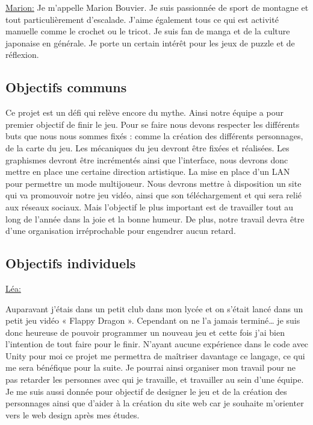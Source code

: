 \documentclass[12pt]{extarticle}
\begin{document}
\newpage
\underline{Marion:}
Je m'appelle Marion Bouvier. Je suis passionnée de sport de montagne et tout particulièrement d'escalade. J'aime également tous ce qui est activité manuelle comme le crochet ou le tricot. Je suis fan de manga et de la culture japonaise en générale. Je porte un certain intérêt pour les jeux de puzzle et de réflexion.

\subsection{Objectifs communs}

Ce projet est un défi qui relève encore du mythe. Ainsi notre équipe a pour premier objectif de finir le jeu. Pour se faire nous devons respecter les différents buts que nous nous sommes fixés :
comme la création des différents personnages, de la carte du jeu. Les mécaniques du jeu devront être fixées et réalisées. Les graphismes devront être incrémentés ainsi que l’interface, nous devrons donc mettre en place une certaine direction artistique. La mise en place d’un LAN pour permettre un mode multijoueur. Nous devrons mettre à disposition un site qui va promouvoir notre jeu vidéo, ainsi que son téléchargement et qui sera relié aux réseaux sociaux. Mais l’objectif le plus important est de travailler tout au long de l’année dans la joie et la bonne humeur. De plus, notre travail devra être d’une organisation irréprochable pour engendrer aucun retard.

\newpage

\subsection{Objectifs individuels}

\vspace{0.5cm}
\underline{Léa:}

Auparavant j’étais dans un petit club dans mon lycée et on s’était lancé dans un petit jeu vidéo « Flappy Dragon ». Cependant on ne l’a jamais terminé… je suis donc heureuse de pouvoir programmer un nouveau jeu et cette fois j’ai bien l’intention de tout faire pour le finir. N’ayant aucune expérience dans le code avec Unity pour moi ce projet me permettra de maîtriser davantage ce langage, ce qui me sera bénéfique pour la suite. Je pourrai ainsi organiser mon travail pour ne pas retarder les personnes avec qui je travaille, et travailler au sein d’une équipe. Je me suis aussi donnée pour objectif de designer le jeu et de la création des personnages ainsi que d'aider à la création du site web car je souhaite m'orienter vers le web design après mes études.
\end{document}
